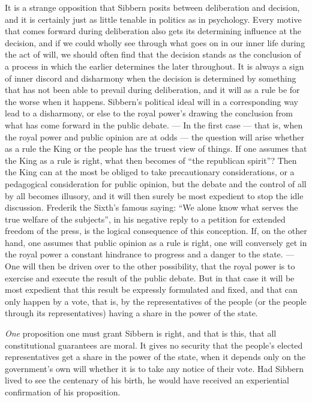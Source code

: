 \documentclass[12pt,a4paper,openany]{book}
\newcommand{\opage}[1]{\marginnote{\footnotesize\textit{[#1]}}}
\begin{document}
It is a strange opposition that Sibbern posits
between deliberation and decision, and it is certainly just as
little tenable in politics as in psychology. Every motive
that comes forward during deliberation also gets its
determining influence at the decision, and if we could wholly
see through what goes on in our inner life during the act of will,
we should often find that the decision stands as the conclusion of
a process in which the earlier determines the later throughout.
It is always a sign of inner discord and disharmony
when the decision is determined by something that has not been able
to prevail during deliberation, and it will as a rule be for
the worse when it happens. Sibbern's political ideal will in
a corresponding way lead to a disharmony, or else to
the royal power's drawing the conclusion from what has come forward
in the public debate. --- In the first case --- that is,
when the royal power and public opinion are at odds ---
the question will arise whether as a rule the King or the people
has the truest view of things. If one assumes that the King
as a rule is right, what then becomes of ``the republican
spirit''? Then the King can at the most be obliged
to take precautionary considerations, or a pedagogical consideration
for public opinion, but the debate and the control of
all by all becomes illusory, and it will then surely be
most expedient to stop the idle discussion. Frederik
the Sixth's famous saying: ``We alone know what serves
the true welfare of the subjects'', in his negative reply to
a petition for extended freedom of the press, is the logical
consequence of this conception. If, on the other hand, one assumes that
public opinion as a rule is right, one will conversely get in
the royal power a constant hindrance to progress and a
danger to the state. --- One will then be driven over to the other
possibility, that the royal power is to exercise and execute the
result of the public debate. But in that case it will be
most expedient that this result be expressly formulated and
fixed, and that can only happen by a vote, that is,
\opage{102}by the representatives of the people (or the people through its
representatives) having a share in the power of the state.

\emph{One} proposition one must grant Sibbern is right, and that is this,
that all constitutional guarantees are moral. It gives no
security that the people's elected representatives get a share in the
power of the state, when it depends only on the government's own will
whether it is to take any notice of their vote.
Had Sibbern lived to see the centenary of his birth,
he would have received an experiential confirmation of his proposition.
\end{document}
